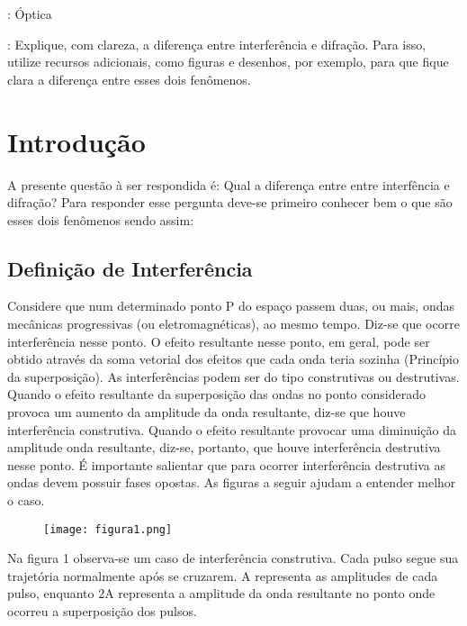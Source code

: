 \documentclass [a4paper, 12pt]{article}
\title{\sc{\textbf{Laboratório de Óptica: Tarefa 3}}}
\author{\textit{João Pedro Silva dos Santos}}
\date{\empty}
\begin{document}
\maketitle

{}: Óptica

{}: Explique, com clareza, a diferença entre interferência e difração.  Para isso, utilize recursos adicionais, como figuras e  desenhos, por exemplo, para que fique clara a diferença entre esses dois fenômenos.

\section{Introdução}

A presente questão à ser respondida é: Qual a diferença entre entre interfência e difração? Para responder esse pergunta deve-se primeiro conhecer bem o que são esses dois fenômenos sendo assim:

\subsection{Definição de Interferência}

Considere que num determinado ponto P do espaço passem duas, ou mais, ondas mecânicas progressivas (ou eletromagnéticas), ao mesmo tempo. Diz-se que ocorre interferência nesse ponto. O efeito resultante nesse ponto, em geral, pode ser obtido através da soma vetorial dos efeitos que cada onda teria sozinha (Princípio da superposição).
As interferências podem ser do tipo construtivas ou destrutivas. Quando o efeito resultante da superposição das ondas no ponto considerado provoca um aumento da amplitude da onda resultante, diz-se que houve interferência construtiva. Quando o efeito resultante provocar uma diminuição da amplitude onda resultante, diz-se, portanto, que houve interferência destrutiva nesse ponto. É importante salientar que para ocorrer interferência destrutiva as ondas devem possuir fases opostas. As figuras a seguir ajudam a entender melhor o caso.

\begin{figure}[!h]
\centering
{\texttt{[image: figura1.png]}}
\caption{\label{fig:figura 1} \empty}
\end{figure}

Na figura 1 observa-se um caso de interferência construtiva. Cada pulso segue sua trajetória normalmente após se cruzarem. A representa as amplitudes de cada pulso, enquanto 2A representa a amplitude da onda resultante no ponto onde ocorreu a superposição dos pulsos.
\end{document}
